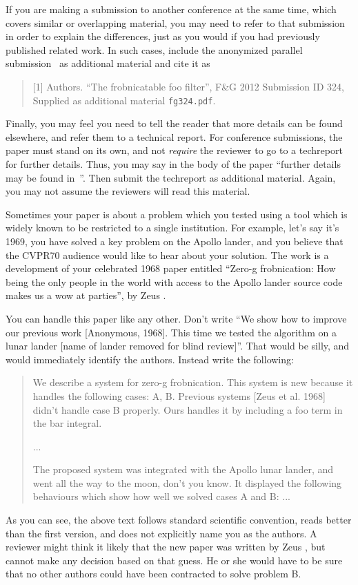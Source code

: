 \documentclass[10pt,twocolumn,letterpaper]{article}
\begin{document}
If you are making a submission to another conference at the same time,
which covers similar or overlapping material, you may need to refer to
that submission in order to explain the differences, just as you would
if you had previously published related work.  In such cases, include
the anonymized parallel submission~\cite{Authors12} as additional
material and cite it as
\begin{quote} [1] Authors. ``The frobnicatable foo filter'', F\&G 2012
  Submission ID 324, Supplied as additional material {\tt fg324.pdf}.
\end{quote}

Finally, you may feel you need to tell the reader that more details
can be found elsewhere, and refer them to a technical report.  For
conference submissions, the paper must stand on its own, and not {\em
  require} the reviewer to go to a techreport for further details.
Thus, you may say in the body of the paper ``further details may be
found in~\cite{Authors12b}''.  Then submit the techreport as
additional material.  Again, you may not assume the reviewers will
read this material.

Sometimes your paper is about a problem which you tested using a tool
which is widely known to be restricted to a single institution.  For
example, let's say it's 1969, you have solved a key problem on the
Apollo lander, and you believe that the CVPR70 audience would like to
hear about your solution.  The work is a development of your
celebrated 1968 paper entitled ``Zero-g frobnication: How being the
only people in the world with access to the Apollo lander source code
makes us a wow at parties'', by Zeus \etal.

You can handle this paper like any other.  Don't write ``We show how
to improve our previous work [Anonymous, 1968].  This time we tested
the algorithm on a lunar lander [name of lander removed for blind
review]''.  That would be silly, and would immediately identify the
authors. Instead write the following:
\begin{quotation}
  \noindent
  We describe a system for zero-g frobnication.  This system is new
  because it handles the following cases: A, B.  Previous systems
  [Zeus et al. 1968] didn't handle case B properly.  Ours handles it
  by including a foo term in the bar integral.

  ...

  The proposed system was integrated with the Apollo lunar lander, and
  went all the way to the moon, don't you know.  It displayed the
  following behaviours which show how well we solved cases A and B:
  ...
\end{quotation}
As you can see, the above text follows standard scientific convention,
reads better than the first version, and does not explicitly name you
as the authors.  A reviewer might think it likely that the new paper
was written by Zeus \etal, but cannot make any decision based on that
guess.  He or she would have to be sure that no other authors could
have been contracted to solve problem B.
\end{document}
